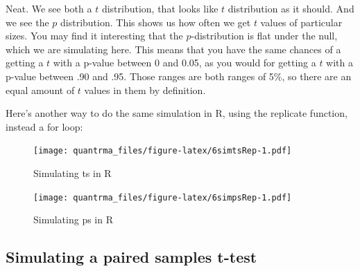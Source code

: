 \documentclass[
]{book}
\newenvironment{Shaded}{\begin{snugshade}}{\end{snugshade}}
\newcommand{\DecValTok}[1]{\textcolor[rgb]{0.00,0.00,0.81}{#1}}
\newcommand{\KeywordTok}[1]{\textcolor[rgb]{0.13,0.29,0.53}{\textbf{#1}}}
\newcommand{\NormalTok}[1]{#1}
\newcommand{\OperatorTok}[1]{\textcolor[rgb]{0.81,0.36,0.00}{\textbf{#1}}}
\newcommand{\StringTok}[1]{\textcolor[rgb]{0.31,0.60,0.02}{#1}}
\begin{document}
Neat. We see both a \(t\) distribution, that looks like \(t\) distribution as it should. And we see the \(p\) distribution. This shows us how often we get \(t\) values of particular sizes. You may find it interesting that the \(p\)-distribution is flat under the null, which we are simulating here. This means that you have the same chances of a getting a \(t\) with a p-value between 0 and 0.05, as you would for getting a \(t\) with a p-value between .90 and .95. Those ranges are both ranges of 5\%, so there are an equal amount of \(t\) values in them by definition.

Here's another way to do the same simulation in R, using the replicate function, instead a for loop:

\begin{Shaded}
\end{Shaded}

\begin{figure}
\centering
\texttt{[image: quantrma\_files/figure-latex/6simtsRep-1.pdf]}
\caption{\label{fig:6simtsRep}Simulating ts in R}
\end{figure}

\begin{Shaded}
\end{Shaded}

\begin{figure}
\centering
\texttt{[image: quantrma\_files/figure-latex/6simpsRep-1.pdf]}
\caption{\label{fig:6simpsRep}Simulating ps in R}
\end{figure}

\hypertarget{simulating-a-paired-samples-t-test}{%
\subsection{Simulating a paired samples t-test}\label{simulating-a-paired-samples-t-test}}
\end{document}
